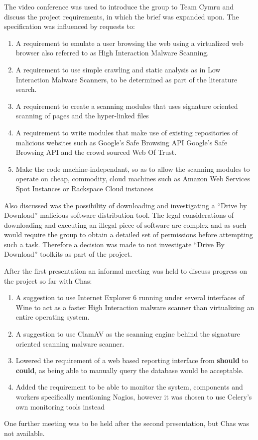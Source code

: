 The video conference was used to introduce the group to Team Cymru and discuss the project requirements, in which the brief was expanded upon. The specification was influenced by requests to:
\begin{enumerate}
    \item A requirement to emulate a user browsing the web using a virtualized web browser also referred to as High Interaction Malware Scanning.

    \item A requirement to use simple crawling and static analysis as in Low Interaction Malware Scanners, to be determined as part of the literature search.

    \item A requirement to create a scanning modules that uses signature oriented scanning of pages and the hyper-linked files

    \item A requirement to write modules that make use of existing repositories of malicious websites such as Google's Safe Browsing API\cite{google-safe} Google's Safe Browsing API and the crowd sourced Web Of Trust.

    \item Make the code machine-independant, so as to allow the scanning modules to operate on cheap, commodity, cloud machines such as Amazon Web Services Spot Instances\cite{aws-spot} or Rackspace Cloud instances\cite{rackspace}
\end{enumerate}

Also discussed was the possibility of downloading and investigating a ``Drive by Download'' malicious software distribution tool.  The legal considerations of downloading and executing an illegal piece of software are complex and as such would require the group to obtain a detailed set of permissions before attempting such a task. Therefore a decision was made to not investigate ``Drive By Download'' toolkits as part of the project.

After the first presentation an informal meeting was held to discuss progress on the project so far with Chas:

\begin{enumerate}
    \item A suggestion to use Internet Explorer 6 running under several interfaces of Wine to act as a faster High Interaction malware scanner than virtualizing an entire operating system.
    \item A suggestion to use ClamAV as the scanning engine behind the signature oriented scanning malware scanner.
    \item Lowered the requirement of a web based reporting interface from \textbf{should} to \textbf{could}, as being able to manually query the database would be acceptable.
    \item Added the requirement to be able to monitor the system, components and workers specifically mentioning Nagios, however it was chosen to use Celery's own monitoring tools instead
\end{enumerate}

One further meeting was to be held after the second presentation, but Chas was not available.

